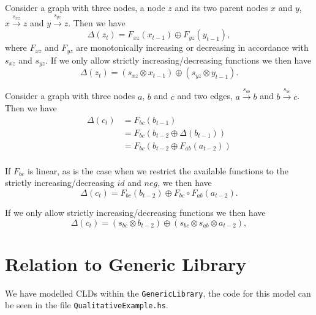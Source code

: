 \documentclass[a4paper,11pt]{article}
\begin{document}
Consider a graph with three nodes, a node $z$ and its two parent nodes
$x$ and $y$, $x\xrightarrow{s_{xz}} z$ and $y\xrightarrow{s_{yz}} z$.
%
Then we have
\[\Delta(z_t) = F_{xz}(x_{t-1}) \oplus F_{yz}(y_{t-1}),\]
where $F_{xz}$ and $F_{yz}$ are monotonically increasing or decreasing in
accordance with $s_{xz}$ and $s_{yz}$.
%
If we only allow strictly increasing/decreasing functions we then have
\[\Delta(z_t) = (s_{xz}\otimes x_{t-1})\oplus (s_{yz}\otimes y_{t-1}).\]

Consider a graph with three nodes $a$, $b$ and $c$ and two edges,
$a\xrightarrow{s_{ab}} b$ and $b\xrightarrow{s_{bc}} c$. Then we have
\begin{align*}
\Delta(c_t) &= F_{bc}(b_{t-1})\\
&= F_{bc}(b_{t-2} \oplus \Delta(b_{t-1}))\\
&= F_{bc}(b_{t-2}  \oplus F_{ab}(a_{t-2}))\\
\end{align*}

If $F_{bc}$ is linear, as is the case when we restrict the available functions
to the strictly increasing/decreasing $id$ and $neg$,
we then have
\[\Delta(c_t) = F_{bc}(b_{t-2})\oplus F_{bc}\circ F_{ab}(a_{t-2}).\]

If we only allow strictly increasing/decreasing functions we then have
\[\Delta(c_t) = (s_{bc}\otimes b_{t-2})\oplus (s_{bc}\otimes s_{ab}\otimes a_{t-2}),\]

\section{Relation to Generic Library}
We have modelled CLDs within the \verb|GenericLibrary|, the code for this model
can be seen in the file \verb|QualitativeExample.hs|. \\

\end{document}
